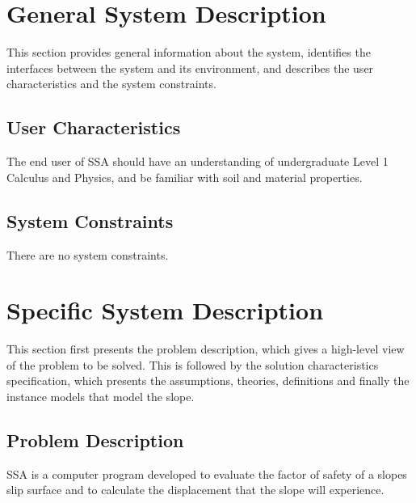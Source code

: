 \documentclass[12pt]{article}
\begin{document}
\section{General System Description}
\label{Sec:GSD}
This section provides general information about the system, identifies the interfaces between the system and its environment, and describes the user characteristics and the system constraints.
\subsection{User Characteristics}
\label{Sec:UC}
The end user of SSA should have an understanding of undergraduate Level 1 Calculus and Physics, and be familiar with soil and material properties.
\subsection{System Constraints}
\label{Sec:SC}
There are no system constraints.
\section{Specific System Description}
\label{Sec:SSD}
This section first presents the problem description, which gives a high-level view of the problem to be solved. This is followed by the solution characteristics specification, which presents the assumptions, theories, definitions and finally the instance models that model the slope.
\subsection{Problem Description}
\label{Sec:PD}
SSA is a computer program developed to evaluate the factor of safety of a slopes slip surface and to calculate the displacement that the slope will experience.
\end{document}
